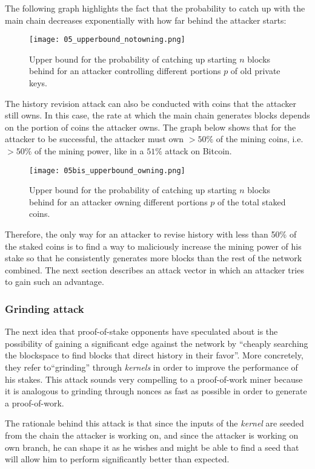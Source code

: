 \documentclass[a4paper,11pt]{article}
\begin{document}
The following graph highlights the fact that the probability to catch up with the main chain decreases exponentially with how far behind the attacker starts:
\begin{figure}[H]
\centering
\texttt{[image: 05\_upperbound\_notowning.png]}
\caption{Upper bound for the probability of catching up starting $n$ blocks behind for an attacker controlling different portions $p$ of old private keys.}
\end{figure}

The history revision attack can also be conducted with coins that the attacker still owns. In this case, the rate at which the main chain generates blocks depends on the portion of coins the attacker owns. The graph below shows that for the attacker to be successful, the attacker must own $>50\%$ of the mining coins, i.e. $>50\%$ of the mining power, like in a $51\%$ attack on Bitcoin. 

\begin{figure}[H]
\centering
\texttt{[image: 05bis\_upperbound\_owning.png]}
\caption{Upper bound for the probability of catching up starting $n$ blocks behind for an attacker owning different portions $p$ of the total staked coins.}
\end{figure}

Therefore, the only way for an attacker to revise history with less than 50\% of the staked coins is to find a way to maliciously increase the mining power of his stake so that he consistently generates more blocks than the rest of the network combined. The next section describes an attack vector in which an attacker tries to gain such an advantage.

\subsubsection{Grinding attack}
\label{333}

The next idea that proof-of-stake opponents have speculated about is the possibility of gaining a significant edge against the network by ``cheaply searching the blockspace to find blocks that direct history in their favor''\cite{distributedconsensus}. More concretely, they refer to``grinding'' through \textit{kernels} in order to improve the performance of his stakes. This attack sounds very compelling to a proof-of-work miner because it is analogous to grinding through nonces as fast as possible in order to generate a proof-of-work. 
 
The rationale behind this attack is that since the inputs of the \textit{kernel} are seeded from the chain the attacker is working on, and since the attacker is working on own branch, he can shape it as he wishes and might be able to find a seed that will allow him to perform significantly better than expected.
\end{document}
